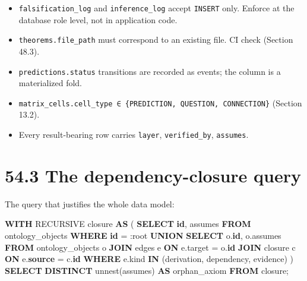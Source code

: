 \documentclass[
  11pt]{report}
\newenvironment{Shaded}{}{}
\newcommand{\CharTok}[1]{\textcolor[rgb]{0.25,0.44,0.63}{#1}}
\newcommand{\KeywordTok}[1]{\textcolor[rgb]{0.00,0.44,0.13}{\textbf{#1}}}
\newcommand{\NormalTok}[1]{#1}
\newcommand{\OperatorTok}[1]{\textcolor[rgb]{0.40,0.40,0.40}{#1}}
\newcommand{\StringTok}[1]{\textcolor[rgb]{0.25,0.44,0.63}{#1}}
\providecommand{\tightlist}{%
  \setlength{\itemsep}{0pt}\setlength{\parskip}{0pt}}
\begin{document}
\begin{itemize}
\tightlist
\item
  \texttt{falsification\_log} and \texttt{inference\_log} accept
  \texttt{INSERT} only. Enforce at the database role level, not in
  application code.
\item
  \texttt{theorems.file\_path} must correspond to an existing file. CI
  check (Section 48.3).
\item
  \texttt{predictions.status} transitions are recorded as events; the
  column is a materialized fold.
\item
  \texttt{matrix\_cells.cell\_type\ ∈\ \{PREDICTION,\ QUESTION,\ CONNECTION\}}
  (Section 13.2).
\item
  Every result-bearing row carries \texttt{layer},
  \texttt{verified\_by}, \texttt{assumes}.
\end{itemize}

\hypertarget{the-dependency-closure-query}{%
\section{54.3 The dependency-closure
query}\label{the-dependency-closure-query}}

The query that justifies the whole data model:

\begin{Shaded}
\begin{Highlighting}[]
\KeywordTok{WITH}\NormalTok{ RECURSIVE closure }\KeywordTok{AS}\NormalTok{ (}
    \KeywordTok{SELECT} \KeywordTok{id}\NormalTok{, assumes }\KeywordTok{FROM}\NormalTok{ ontology\_objects }\KeywordTok{WHERE} \KeywordTok{id} \OperatorTok{=} \CharTok{:root}
  \KeywordTok{UNION}
    \KeywordTok{SELECT}\NormalTok{ o.}\KeywordTok{id}\NormalTok{, o.assumes}
    \KeywordTok{FROM}\NormalTok{ ontology\_objects o}
    \KeywordTok{JOIN}\NormalTok{ edges e }\KeywordTok{ON}\NormalTok{ e.target }\OperatorTok{=}\NormalTok{ o.}\KeywordTok{id}
    \KeywordTok{JOIN}\NormalTok{ closure c }\KeywordTok{ON}\NormalTok{ e.}\KeywordTok{source} \OperatorTok{=}\NormalTok{ c.}\KeywordTok{id}
    \KeywordTok{WHERE}\NormalTok{ e.kind }\KeywordTok{IN}\NormalTok{ (}\StringTok{\textquotesingle{}derivation\textquotesingle{}}\NormalTok{, }\StringTok{\textquotesingle{}dependency\textquotesingle{}}\NormalTok{, }\StringTok{\textquotesingle{}evidence\textquotesingle{}}\NormalTok{)}
\NormalTok{)}
\KeywordTok{SELECT} \KeywordTok{DISTINCT}\NormalTok{ unnest(assumes) }\KeywordTok{AS}\NormalTok{ orphan\_axiom }\KeywordTok{FROM}\NormalTok{ closure;}
\end{Highlighting}
\end{Shaded}
\end{document}
